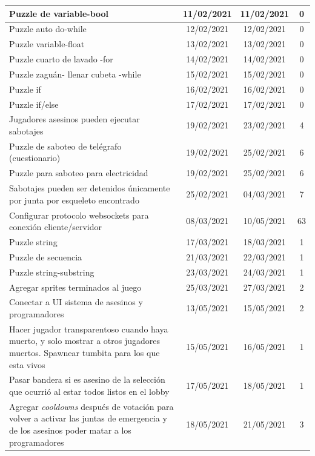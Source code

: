 \begin{longtable}[c]{|m{5cm}|c|c|c|}
        Puzzle de variable-bool & 11/02/2021 & 11/02/2021 & 0 \\ \hline
        Puzzle auto do-while & 12/02/2021 & 12/02/2021 & 0 \\ \hline
        Puzzle variable-float & 13/02/2021 & 13/02/2021 & 0 \\ \hline
        Puzzle cuarto de lavado -for & 14/02/2021 & 14/02/2021 & 0 \\ \hline
        Puzzle zaguán- llenar cubeta -while & 15/02/2021 & 15/02/2021 & 0 \\ \hline
        Puzzle if & 16/02/2021 & 16/02/2021 & 0 \\ \hline
        Puzzle if/else & 17/02/2021 & 17/02/2021 & 0 \\ \hline
        Jugadores asesinos pueden ejecutar sabotajes & 19/02/2021 & 23/02/2021 & 4 \\ \hline
        Puzzle de saboteo de telégrafo (cuestionario) & 19/02/2021 & 25/02/2021 & 6 \\ \hline
        Puzzle para saboteo para electricidad & 19/02/2021 & 25/02/2021 & 6 \\ \hline
        Sabotajes pueden ser detenidos únicamente por junta por esqueleto encontrado & 25/02/2021 & 04/03/2021 & 7 \\ \hline
        Configurar protocolo websockets para conexión cliente/servidor & 08/03/2021 & 10/05/2021 & 63 \\ \hline
        Puzzle string & 17/03/2021 & 18/03/2021 & 1 \\ \hline
        Puzzle de secuencia & 21/03/2021 & 22/03/2021 & 1 \\ \hline
        Puzzle string-substring & 23/03/2021 & 24/03/2021 & 1 \\ \hline
        Agregar sprites terminados al juego & 25/03/2021 & 27/03/2021 & 2 \\ \hline
        Conectar a UI sistema de asesinos y programadores & 13/05/2021 & 15/05/2021 & 2 \\ \hline
        Hacer jugador transparentoso cuando haya muerto, y solo mostrar a otros jugadores muertos. Spawnear tumbita para los que esta vivos & 15/05/2021 & 16/05/2021 & 1 \\ \hline
        Pasar bandera si es asesino de la selección que ocurrió al estar todos listos en el lobby & 17/05/2021 & 18/05/2021 & 1 \\ \hline
        Agregar \textit{cooldowns} después de votación para volver a activar las juntas de emergencia y de los asesinos poder matar a los programadores & 18/05/2021 & 21/05/2021 & 3 \\ \hline

\end{longtable}
